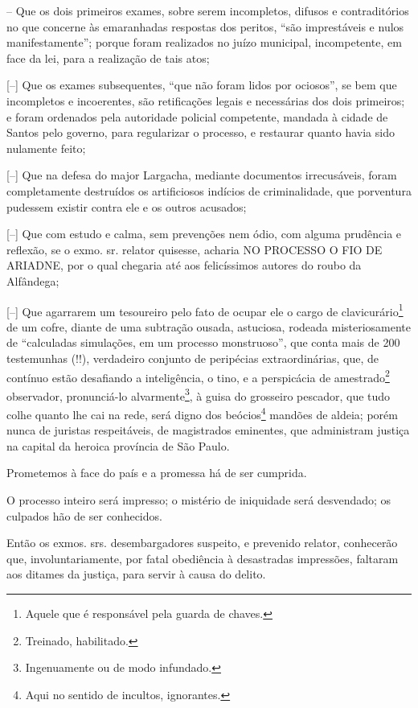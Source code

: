 -- Que os dois primeiros exames, sobre serem incompletos, difusos e
contraditórios no que concerne às emaranhadas respostas dos peritos,
``são imprestáveis e nulos manifestamente''; porque foram realizados no
juízo municipal, incompetente, em face da lei, para a realização de tais
atos;

{[}--{]} Que os exames subsequentes, ``que não foram lidos por
ociosos'', se bem que incompletos e incoerentes, são retificações legais
e necessárias dos dois primeiros; e foram ordenados pela autoridade
policial competente, mandada à cidade de Santos pelo governo, para
regularizar o processo, e restaurar quanto havia sido nulamente feito;

{[}--{]} Que na defesa do major Largacha, mediante documentos
irrecusáveis, foram completamente destruídos os artificiosos indícios de
criminalidade, que porventura pudessem existir contra ele e os outros
acusados;

{[}--{]} Que com estudo e calma, sem prevenções nem ódio, com alguma
prudência e reflexão, se o exmo. sr. relator quisesse, acharia NO
PROCESSO O FIO DE ARIADNE, por o qual chegaria até aos felicíssimos
autores do roubo da Alfândega;

{[}--{]} Que agarrarem um tesoureiro pelo fato de ocupar ele o cargo de
clavicurário\footnote{Aquele que é responsável pela guarda de chaves.}
de um cofre, diante de uma subtração ousada, astuciosa, rodeada
misteriosamente de ``calculadas simulações, em um processo monstruoso'',
que conta mais de 200 testemunhas (!!), verdadeiro conjunto de
peripécias extraordinárias, que, de contínuo estão desafiando a
inteligência, o tino, e a perspicácia de amestrado\footnote{Treinado,
  habilitado.} observador, pronunciá-lo alvarmente\footnote{Ingenuamente
  ou de modo infundado.}, à guisa do grosseiro pescador, que tudo colhe
quanto lhe cai na rede, será digno dos beócios\footnote{Aqui no sentido
  de incultos, ignorantes.} mandões de aldeia; porém nunca de juristas
respeitáveis, de magistrados eminentes, que administram justiça na
capital da heroica província de São Paulo.

Prometemos à face do país e a promessa há de ser cumprida.

O processo inteiro será impresso; o mistério de iniquidade será
desvendado; os culpados hão de ser conhecidos.

Então os exmos. srs. desembargadores suspeito, e prevenido relator,
conhecerão que, involuntariamente, por fatal obediência à desastradas
impressões, faltaram aos ditames da justiça, para servir à causa do
delito.

